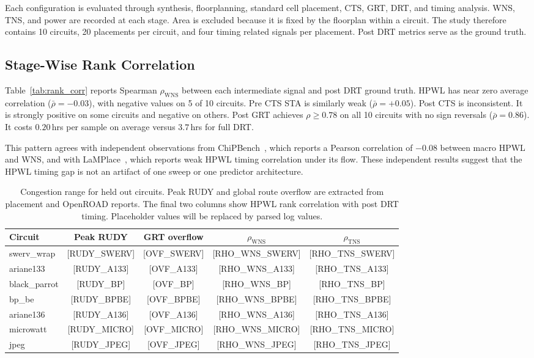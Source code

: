 \documentclass[sigconf,anonymous,review,9pt]{acmart}
\begin{document}
Each configuration is evaluated through synthesis, floorplanning,
standard cell placement, CTS, GRT, DRT, and timing analysis. WNS, TNS,
and power are recorded at each stage. Area is excluded because it is
fixed by the floorplan within a circuit. The study therefore contains
10 circuits, 20 placements per circuit, and four timing related signals
per placement. Post DRT metrics serve as the ground truth.

\subsection{Stage-Wise Rank Correlation}

Table~\ref{tab:rank_corr} reports Spearman $\rho_{\text{WNS}}$ between
each intermediate signal and post DRT ground truth. HPWL has near zero
average correlation ($\bar\rho = -0.03$), with negative values on 5 of
10 circuits. Pre CTS STA is similarly weak
($\bar\rho = +0.05$). Post CTS is inconsistent. It is strongly positive
on some circuits and negative on others. Post GRT achieves
$\rho \geq 0.78$ on all 10 circuits with no sign reversals
($\bar\rho = 0.86$). It costs $0.20$\,hrs per sample on average versus
$3.7$\,hrs for full DRT.

This pattern agrees with independent observations from
ChiPBench~\cite{chipbench2025}, which reports a Pearson correlation of
$-0.08$ between macro HPWL and WNS, and with LaMPlace~\cite{lamplace2025},
which reports weak HPWL timing correlation under its flow. These
independent results suggest that the HPWL timing gap is not an artifact
of one sweep or one predictor architecture.

\begin{table}[t]
\centering
\caption{Congestion range for held out circuits. Peak RUDY and global route overflow are extracted from placement and OpenROAD reports. The final two columns show HPWL rank correlation with post DRT timing. Placeholder values will be replaced by parsed log values.}
\label{tab:congestion}
\renewcommand{\arraystretch}{1.12}
\footnotesize
\begin{tabular}{@{}l cccc@{}}
\toprule
Circuit & Peak RUDY & GRT overflow & $\rho_{\text{WNS}}$ & $\rho_{\text{TNS}}$ \\
\midrule
swerv\_wrap   & [RUDY_SWERV] & [OVF_SWERV] & [RHO_WNS_SWERV] & [RHO_TNS_SWERV] \\
ariane133     & [RUDY_A133]  & [OVF_A133]  & [RHO_WNS_A133]  & [RHO_TNS_A133] \\
black\_parrot & [RUDY_BP]    & [OVF_BP]    & [RHO_WNS_BP]    & [RHO_TNS_BP] \\
bp\_be        & [RUDY_BPBE]  & [OVF_BPBE]  & [RHO_WNS_BPBE]  & [RHO_TNS_BPBE] \\
ariane136     & [RUDY_A136]  & [OVF_A136]  & [RHO_WNS_A136]  & [RHO_TNS_A136] \\
microwatt     & [RUDY_MICRO] & [OVF_MICRO] & [RHO_WNS_MICRO] & [RHO_TNS_MICRO] \\
jpeg          & [RUDY_JPEG]  & [OVF_JPEG]  & [RHO_WNS_JPEG]  & [RHO_TNS_JPEG] \\
\bottomrule
\end{tabular}
\renewcommand{\arraystretch}{1.0}
\end{table}
\end{document}
